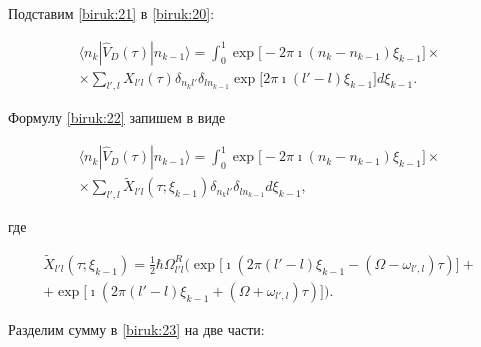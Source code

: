 Подставим \eqref{biruk:21} в \eqref{biruk:20}:

\begin{multline}

\label{biruk:22}

\langle n_k |\hat{V}_D(\tau)|n_{k-1}\rangle=\int _{0}^{1}

\exp\bigl[-2\pi \imath (n_k-n_{k-1})\xi_{k-1}\bigr]

\times

\\

\times

\sum\limits_{l',l}X_{l' l}(\tau)\delta_{n_k l'}\delta_{l n_{k-1}} \exp\bigl[2\pi \imath (l'-l)\xi_{k-1}\bigr]d\xi_{k-1}.

\end{multline}

Формулу \eqref{biruk:22} запишем в виде

\begin{multline}

\label{biruk:23}

\langle n_k |\hat{V}_D(\tau)|n_{k-1}\rangle=\int _{0}^{1}

\exp\bigl[-2\pi \imath (n_k-n_{k-1})\xi_{k-1}\bigr] \times

\\

\times

\sum\limits_{l',l}\tilde{X}_{l' l}(\tau;\xi_{k-1})\delta_{n_k l'}\delta_{l n_{k-1}}d\xi_{k-1}, 

\end{multline}

где

\begin{multline}

\label{biruk:24}

\tilde{X}_{l' l}(\tau;\xi_{k-1})= \frac{1}{2}

\hbar\Omega_{l'l}^R \bigl(\exp \bigr[\imath(2\pi (l'-l)\xi_{k-1}-(\Omega-\omega_{l',l})\tau) \bigr]

+

\\

+

\exp\bigl[\imath (2\pi (l'-l)\xi_{k-1}+(\Omega+\omega_{l',l})\tau)\bigr]\bigr). 

\end{multline}

Разделим сумму в \eqref{biruk:23} на две части:

